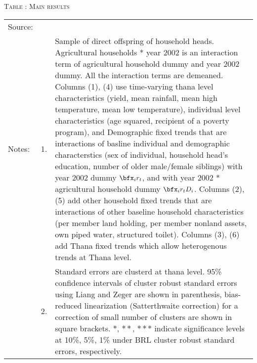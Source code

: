\begin{table}
\hfil\textsc{\footnotesize Table \thetable: Main results\label{MainResults10Table}}\\
\setlength{\tabcolsep}{1pt}
\renewcommand{\arraystretch}{.55}
\hfil

\renewcommand{\arraystretch}{1}
\hfil\begin{tabular}{>{\hfill\scriptsize}p{1cm}<{}>{\hfill\scriptsize}p{.5cm}<{}>{\scriptsize}p{12cm}<{\hfill}}
Source:& \multicolumn{2}{l}{\scriptsize Compiled from IFPRI data. }\\[-1ex]
Notes:& 1. & Sample of direct offspring of household heads. \textsf{Agricultural households * year 2002} is an interaction term of agricultural household dummy and year 2002 dummy. All the interaction terms are demeaned. Columns \textsf{(1), (4)} use time-varying thana level characteristics (yield, mean rainfall, mean high temperature, mean low temperature), individual level characteristics (age squared, recipient of a poverty program), and \textsf{Demographic fixed trends} that are interactions of basline individual and demographic characterstics (sex of individual, household head's education, number of older male/female siblings) with year 2002 dummy $\bfx_{i}r_{t}$, and with year 2002 * agricultural household dummy $\bfx_{i}r_{t}D_{i}$. Columns \textsf{(2), (5)} add \textsf{other household fixed trends} that are interactions of other baseline household characteristics (per member land holding, per member nonland assets, own piped water, structured toilet). Columns \textsf{(3), (6)} add \textsf{Thana fixed trends} which allow heterogenous trends at Thana level. \\[-1ex]
& 2. & Standard errors are clusterd at thana level. 95\% confidence intervals of cluster robust standard errors using Liang and Zeger are shown in parenthesis, bias-reduced linearization (Satterthwaite correction) for a correction of small number of clusters are shown in square brackets. $*$, $**$, $***$ indicate significance levels at 10\%, 5\%, 1\% under BRL cluster robust standard errors, respectively.\end{tabular}
\end{table}

